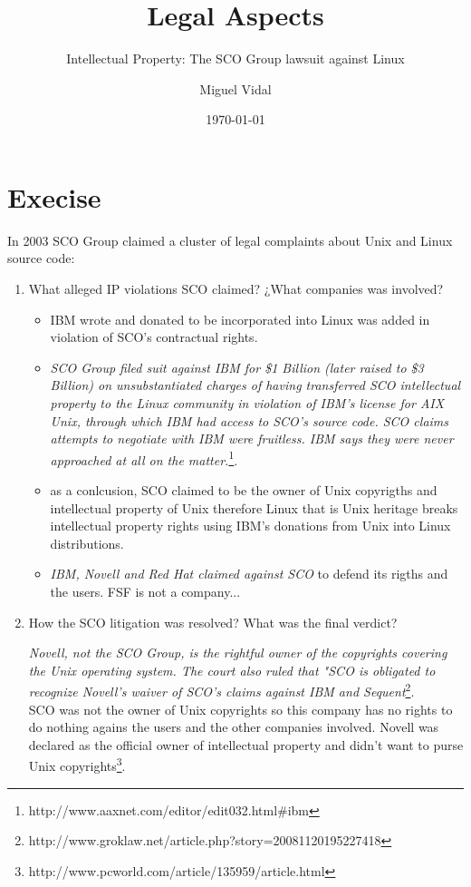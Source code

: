 \documentclass[11pt]{scrartcl}
\title{\textbf{Legal Aspects}}
\subtitle{Intellectual Property: The SCO Group lawsuit against Linux}
\author{Miguel Vidal}
\date{\today}
\begin{document}
\maketitle

\section{Execise}

In 2003 SCO Group claimed a cluster of legal complaints about Unix and Linux source code:
 
\begin{enumerate}

	\item What alleged IP violations SCO claimed? ¿What companies was involved?

		\begin{itemize}
			\item IBM wrote and donated to be incorporated into Linux was added in violation of SCO's contractual rights.
			\item \emph{SCO Group filed suit against IBM for \$1 Billion (later raised to \$3 Billion) on unsubstantiated charges of having transferred SCO intellectual property to the Linux community in violation of IBM's license for AIX Unix, through which IBM had access to SCO's source code. SCO claims attempts to negotiate with IBM were fruitless. IBM says they were never approached at all on the matter.}\footnote{http://www.aaxnet.com/editor/edit032.html\#ibm}.
			
			\item as a conlcusion, SCO claimed to be the owner of Unix copyrigths and intellectual property of Unix therefore Linux that is Unix heritage breaks intellectual property rights using IBM's donations from Unix into Linux distributions.

			\item \emph{IBM, Novell and Red Hat claimed against SCO} to defend its rigths and the users. FSF is not a company...
		\end{itemize}
		
	\item How the SCO litigation was resolved? What was the final verdict?

	\emph{Novell, not the SCO Group, is the rightful owner of the copyrights covering the Unix operating system. The court also ruled that "SCO is obligated to recognize Novell's waiver of SCO's claims against IBM and Sequent}\footnote{http://www.groklaw.net/article.php?story=20081120195227418}.\\
	SCO was not the owner of Unix copyrights so this company has no rights to do nothing agains the users and the other companies involved. Novell was declared as the official owner of intellectual property and didn't want to purse Unix copyrights\footnote{http://www.pcworld.com/article/135959/article.html}.


\end{enumerate}
\end{document}

